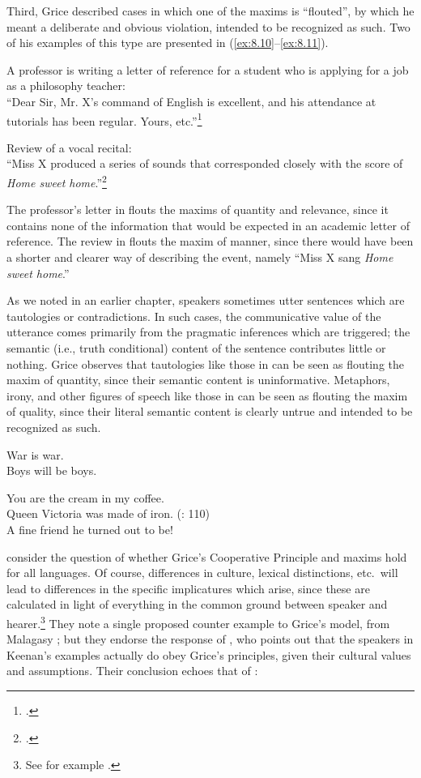 Third, Grice described cases in which one of the maxims is “flouted”, by which he meant a deliberate and obvious violation, intended to be recognized as such. Two of his examples of this type are presented in (\ref{ex:8.10}--\ref{ex:8.11}).


\ea \label{ex:8.10}
A professor is writing a letter of reference for a student who is applying for a job as a philosophy teacher:\\
“Dear Sir, Mr. X’s command of English is excellent, and his attendance at tutorials has been regular. Yours, etc.”\footnote{\citet[52]{Grice1975}.}
\z

\ea \label{ex:8.11}
Review of a vocal recital:\\
“Miss X produced a series of sounds that corresponded closely with the score of \textit{Home sweet home}.”\footnote{\citet[55]{Grice1975}.}
\z


The professor’s letter in  flouts the maxims of quantity and relevance, since it contains none of the information that would be expected in an academic letter of reference. The review in  flouts the maxim of manner, since there would have been a shorter and clearer way of describing the event, namely “Miss X sang \textit{Home sweet home}.”



As we noted in an earlier chapter, speakers sometimes utter sentences which are tautologies or contradictions. In such cases, the communicative value of the utterance comes primarily from the pragmatic inferences which are triggered; the semantic (i.e., truth conditional) content of the sentence contributes little or nothing. Grice observes that tautologies like those in  can be seen as flouting the maxim of quantity, since their semantic content is uninformative. Metaphors, irony, and other figures of speech like those in  can be seen as flouting the maxim of quality, since their literal semantic content is clearly untrue and intended to be recognized as such.


\ea \label{ex:8.12}
\ea War is war.\\
\ex Boys will be boys.
                       \z
\z

\ea \label{ex:8.13}
\ea You are the cream in my coffee.\\
\ex Queen Victoria was made of iron. (\citealt{Levinson1983}: 110)\\
\ex A fine friend he turned out to be!
                       \z
\z


 consider the question of whether Grice’s Cooperative Principle and maxims hold for all languages. Of course, differences in culture, lexical distinctions, etc.~will lead to differences in the specific implicatures which arise, since these are calculated in light of everything in the common ground between speaker and hearer.\footnote{See for example \citet{Matsumoto1995}.} They note a single proposed counter example to Grice’s model, from Malagasy \citep{Keenan1974}; but they endorse the response of \citet{Prince1982}, who points out that the speakers in Keenan’s examples actually do obey Grice’s principles, given their cultural values and assumptions. Their conclusion echoes that of \citet[419]{Green1990}:


